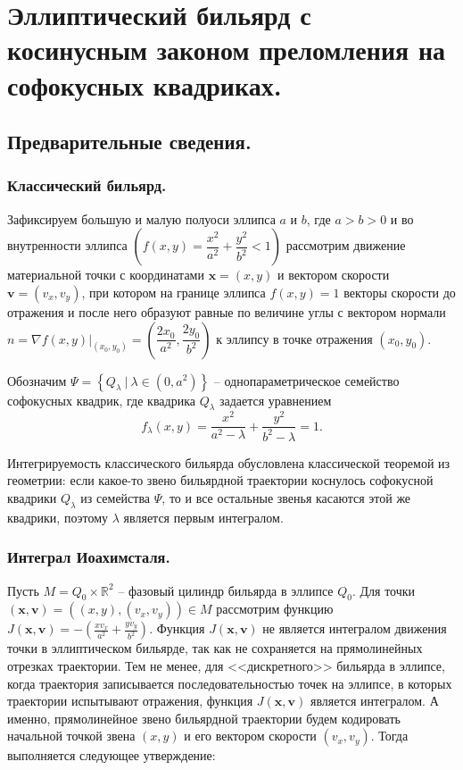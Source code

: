 \chapter{Эллиптический бильярд с косинусным законом преломления на софокусных квадриках.}\label{ch:ch3}

\section{Предварительные сведения.}\label{sec:ch3/sec1}

\subsection{Классический бильярд.}\label{sec:ch3/sec1/sub1}

Зафиксируем большую и малую полуоси эллипса $a$ и $b$, где $a > b > 0$ и во внутренности эллипса $\left(f(x, y) = \dfrac{x^2}{a^2}+\dfrac{y^2}{b^2} < 1 \right)$ рассмотрим движение материальной точки с координатами $\mathbf{x} = (x, y)$ и вектором скорости $\mathbf{v} = (v_x, v_y)$, при котором на границе эллипса $f(x, y) = 1$ векторы скорости до отражения и после него образуют равные по величине углы с вектором нормали $n=\left.\nabla f(x,y)\right|_{(x_0,y_0)} = \left( \dfrac{2x_0}{a^2},\dfrac{2y_0}{b^2}\right)$ к эллипсу в точке отражения $(x_0, y_0)$.

Обозначим $\Psi = \left\{ Q_{\lambda} \ |\ \lambda \in (0, a^2) \right\}$ -- однопараметрическое семейство софокусных квадрик, где квадрика $Q_\lambda$ задается уравнением 
$$f_\lambda(x,y)=\dfrac{x^2}{a^2-\lambda} + \dfrac{y^2}{b^2-\lambda} = 1.$$

Интегрируемость классического бильярда обусловлена классической теоремой из геометрии: если какое-то звено бильярдной траектории коснулось софокусной квадрики $Q_\lambda$ из семейства $\Psi$, то и все остальные звенья касаются этой же квадрики, поэтому $\lambda$ является первым интегралом.


\subsection{Интеграл Иоахимсталя.}\label{sec:ch3/sec1/sub2}
Пусть $M = Q_0 \times \mathbb{R}^2$ -- фазовый цилиндр бильярда в эллипсе $Q_0$. Для точки $(\mathbf{x}, \mathbf{v}) = ((x,y), (v_x, v_y)) \in M$ рассмотрим функцию $J(\mathbf{x}, \mathbf{v}) = -\left(
\frac{x v_x}{a^2} + \frac{y v_y}{b^2} \right).$
Функция $J(\mathbf{x}, \mathbf{v})$ не является интегралом движения точки в эллиптическом бильярде, так как не сохраняется на прямолинейных отрезках траектории. Тем не менее, для <<дискретного>> бильярда в эллипсе, когда траектория записывается последовательностью точек на эллипсе, в которых траектории испытывают отражения, функция $J(\mathbf{x}, \mathbf{v})$ является интегралом. А именно, прямолинейное звено бильярдной траектории будем кодировать начальной точкой звена $(x, y)$ и его вектором скорости $(v_x, v_y)$. Тогда выполняется следующее утверждение: 


